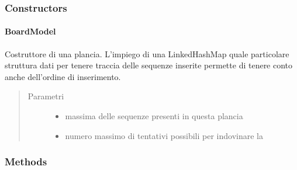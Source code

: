 \documentclass[letterpaper,10pt,italian,openany,oneside]{sphinxmanual}
\begin{document}
\subsubsection{Constructors}
\label{\detokenize{source/it/unicam/cs/pa/mastermind/gamecore/BoardModel:constructors}}

\paragraph{BoardModel}
\label{\detokenize{source/it/unicam/cs/pa/mastermind/gamecore/BoardModel:id1}}

\begin{fulllineitems}
\label{\detokenize{source/it/unicam/cs/pa/mastermind/gamecore/BoardModel:it.unicam.cs.pa.mastermind.gamecore.BoardModel.BoardModel(int, int)}}
Costruttore di una plancia. L’impiego di una LinkedHashMap quale particolare struttura dati per tenere traccia delle sequenze inserite permette di tenere conto anche dell’ordine di inserimento.
\begin{quote}\begin{description}
\item[{Parametri}] \leavevmode\begin{itemize}
\item {} 
 \textendash{} massima delle sequenze presenti in questa plancia

\item {} 
 \textendash{} numero massimo di tentativi possibili per indovinare la 

\end{itemize}

\end{description}\end{quote}

\end{fulllineitems}



\subsubsection{Methods}
\label{\detokenize{source/it/unicam/cs/pa/mastermind/gamecore/BoardModel:methods}}
\end{document}
